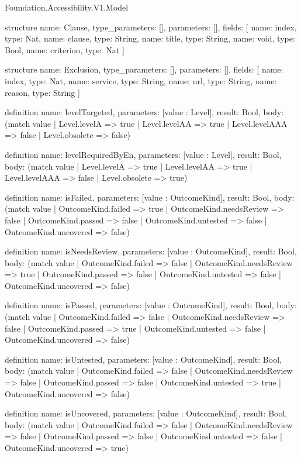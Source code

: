 \begin{lexlean}{Foundation.Accessibility.V1.Model}
\begin{semanticmodule}
structure{
  name: Clause,
  type_parameters: [],
  parameters: [],
  fields: [
    {name: index, type: Nat},
    {name: clause, type: String},
    {name: title, type: String},
    {name: void, type: Bool},
    {name: criterion, type: Nat}
  ]
}

structure{
  name: Exclusion,
  type_parameters: [],
  parameters: [],
  fields: [
    {name: index, type: Nat},
    {name: service, type: String},
    {name: url, type: String},
    {name: reason, type: String}
  ]
}

definition{
  name: levelTargeted,
  parameters: [value : Level],
  result: Bool,
  body: (match value
    | Level.levelA => true
    | Level.levelAA => true
    | Level.levelAAA => false
    | Level.obsolete => false)
}

definition{
  name: levelRequiredByEn,
  parameters: [value : Level],
  result: Bool,
  body: (match value
    | Level.levelA => true
    | Level.levelAA => true
    | Level.levelAAA => false
    | Level.obsolete => true)
}

definition{
  name: isFailed,
  parameters: [value : OutcomeKind],
  result: Bool,
  body: (match value
    | OutcomeKind.failed => true
    | OutcomeKind.needsReview => false
    | OutcomeKind.passed => false
    | OutcomeKind.untested => false
    | OutcomeKind.uncovered => false)
}

definition{
  name: isNeedsReview,
  parameters: [value : OutcomeKind],
  result: Bool,
  body: (match value
    | OutcomeKind.failed => false
    | OutcomeKind.needsReview => true
    | OutcomeKind.passed => false
    | OutcomeKind.untested => false
    | OutcomeKind.uncovered => false)
}

definition{
  name: isPassed,
  parameters: [value : OutcomeKind],
  result: Bool,
  body: (match value
    | OutcomeKind.failed => false
    | OutcomeKind.needsReview => false
    | OutcomeKind.passed => true
    | OutcomeKind.untested => false
    | OutcomeKind.uncovered => false)
}

definition{
  name: isUntested,
  parameters: [value : OutcomeKind],
  result: Bool,
  body: (match value
    | OutcomeKind.failed => false
    | OutcomeKind.needsReview => false
    | OutcomeKind.passed => false
    | OutcomeKind.untested => true
    | OutcomeKind.uncovered => false)
}

definition{
  name: isUncovered,
  parameters: [value : OutcomeKind],
  result: Bool,
  body: (match value
    | OutcomeKind.failed => false
    | OutcomeKind.needsReview => false
    | OutcomeKind.passed => false
    | OutcomeKind.untested => false
    | OutcomeKind.uncovered => true)
}


\end{semanticmodule}
\end{lexlean}
